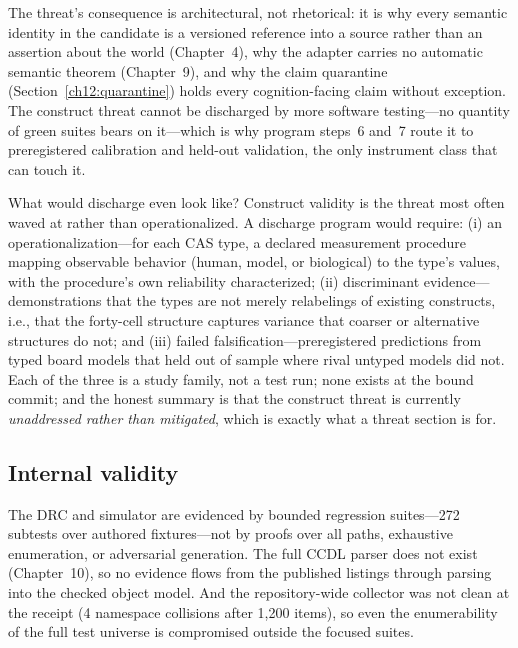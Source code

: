 The threat's consequence is architectural, not rhetorical: it is why every semantic identity in the candidate is a versioned reference into a source rather than an assertion about the world (Chapter~4), why the adapter carries no automatic semantic theorem (Chapter~9), and why the claim quarantine (Section~\ref{ch12:quarantine}) holds every cognition-facing claim without exception. The construct threat cannot be discharged by more software testing---no quantity of green suites bears on it---which is why program steps~6 and~7 route it to preregistered calibration and held-out validation, the only instrument class that can touch it.

What would discharge even look like? Construct validity is the threat most often waved at rather than operationalized. A discharge program would require: (i) an operationalization---for each CAS type, a declared measurement procedure mapping observable behavior (human, model, or biological) to the type's values, with the procedure's own reliability characterized; (ii) discriminant evidence---demonstrations that the types are not merely relabelings of existing constructs, i.e., that the forty-cell structure captures variance that coarser or alternative structures do not; and (iii) failed falsification---preregistered predictions from typed board models that held out of sample where rival untyped models did not. Each of the three is a study family, not a test run; none exists at the bound commit; and the honest summary is that the construct threat is currently \emph{unaddressed rather than mitigated}, which is exactly what a threat section is for.

\subsection{Internal validity}\label{ch12:threats-internal}

\begin{threat}\label{ch12:threat-internal}
The DRC and simulator are evidenced by bounded regression suites---272 subtests over authored fixtures---not by proofs over all paths, exhaustive enumeration, or adversarial generation. The full CCDL parser does not exist (Chapter~10), so no evidence flows from the published listings through parsing into the checked object model. And the repository-wide collector was not clean at the receipt (4 namespace collisions after 1{,}200 items), so even the enumerability of the full test universe is compromised outside the focused suites.
\end{threat}

